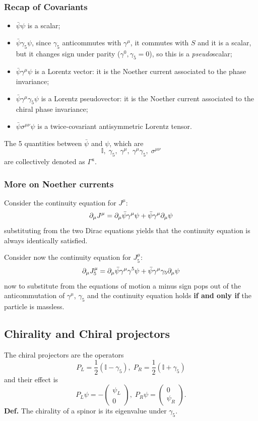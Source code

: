 
\subsubsection{Recap of Covariants}
\begin{itemize}
    \item $\bar\psi\psi$ is a scalar;
    \item $\bar\psi\gamma_5\psi$, since $\gamma_5$ anticommutes with
        $\gamma^\mu$, it commutes with $S$ and it is a scalar, but it changes
        sign under parity (${\gamma^0,\gamma_5}=0$), so this is a
        \textit{pseudo}scalar;
    \item $\bar\psi\gamma^\mu\psi$ is a Lorentz vector: it is the Noether current
        associated to the phase invariance;
    \item $\bar\psi\gamma^\mu\gamma_5\psi$ is a Lorentz pseudovector: it is the
        Noether current associated to the chiral phase invariance;
    \item $\bar\psi\sigma^{\mu\nu}\psi$ is a twice-covariant antisymmetric
        Lorentz tensor.
\end{itemize}
The 5 quantities between $\bar\psi$ and $\psi$, which are
$$\mathbb{I},\;\gamma_5,\;\gamma^\mu,\;\gamma^\mu\gamma_5,\;\sigma^{\mu\nu}$$
are collectively denoted as $\Gamma^a$.

\subsubsection{More on Noether currents}
Consider the continuity equation for $J^\mu$:
$$\partial_\mu J^\mu = \partial_\mu\bar\psi\gamma^\mu\psi + \bar\psi\gamma^\mu\partial_\mu\psi
$$
substituting from the two Dirac equations yields that the continuity equation
is always identically satisfied.

Consider now the continuity equation for $J^\mu_5:$
$$\partial_\mu J^\mu_5 = \partial_\mu\bar\psi\gamma^\mu\gamma^5\psi + \bar\psi
    \gamma^\mu\gamma_5\partial_\mu\psi$$
now to substitute from the equations of motion a minus sign pops out of the
anticommutation of $\gamma^\mu$, $\gamma_5$ and the continuity equation holds
\textbf{if and only if} the particle is massless.

\subsection{Chirality and Chiral projectors}
The chiral projectors are the operators
$$P_L = \frac{1}{2}(\mathbb{I}-\gamma_5),\; P_R=\frac{1}{2}(\mathbb{I}+\gamma_5)$$
and their effect is
$$P_L\psi = -\begin{pmatrix}
\psi_L\\0
\end{pmatrix},\;P_R \psi= \begin{pmatrix}
0\\\psi_R
\end{pmatrix}.
$$
\textbf{Def.} The chirality of a spinor is its eigenvalue under $\gamma_5$.
